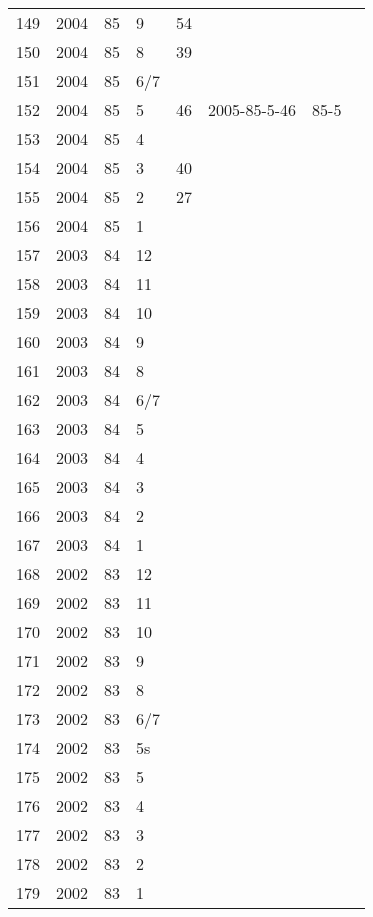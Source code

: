 \begin{longtable}{ |l|l|l|l|l|l|l|l| }
149 & 2004 & 85 &     9 &      54 &  &  & \\
150 & 2004 & 85 &     8 &      39 &  &  & \\
151 & 2004 & 85 &   6/7 &         &  &  & \\
152 & 2004 & 85 &     5 &      46 & 2005-85-5-46 & 85-5 & \\
153 & 2004 & 85 &     4 &         &  &  & \\
154 & 2004 & 85 &     3 &      40 &  &  & \\
155 & 2004 & 85 &     2 &      27 &  &  & \\
156 & 2004 & 85 &     1 &         &  &  & \\
157 & 2003 & 84 &    12 &         &  &  & \\
158 & 2003 & 84 &    11 &         &  &  & \\
159 & 2003 & 84 &    10 &         &  &  & \\
160 & 2003 & 84 &     9 &         &  &  & \\
161 & 2003 & 84 &     8 &         &  &  & \\
162 & 2003 & 84 &   6/7 &         &  &  & \\
163 & 2003 & 84 &     5 &         &  &  & \\
164 & 2003 & 84 &     4 &         &  &  & \\
165 & 2003 & 84 &     3 &         &  &  & \\
166 & 2003 & 84 &     2 &         &  &  & \\
167 & 2003 & 84 &     1 &         &  &  & \\
168 & 2002 & 83 &    12 &         &  &  & \\
169 & 2002 & 83 &    11 &         &  &  & \\
170 & 2002 & 83 &    10 &         &  &  & \\
171 & 2002 & 83 &     9 &         &  &  & \\
172 & 2002 & 83 &     8 &         &  &  & \\
173 & 2002 & 83 &   6/7 &         &  &  & \\
174 & 2002 & 83 &    5s &         &  &  & \\
175 & 2002 & 83 &     5 &         &  &  & \\
176 & 2002 & 83 &     4 &         &  &  & \\
177 & 2002 & 83 &     3 &         &  &  & \\
178 & 2002 & 83 &     2 &         &  &  & \\
179 & 2002 & 83 &     1 &         &  &  & \\

\end{longtable}
